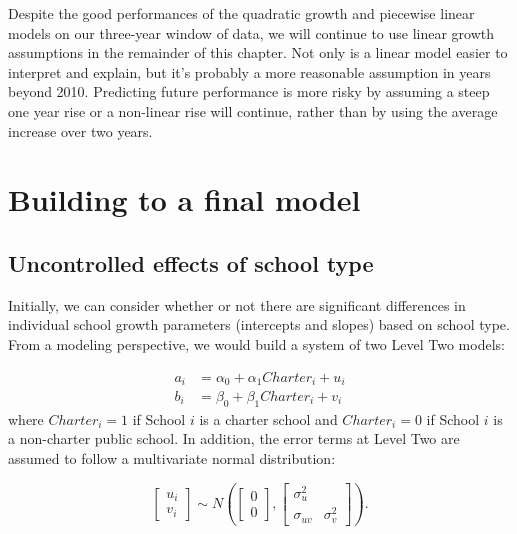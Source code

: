 \documentclass[
]{krantz}
\begin{document}
Despite the good performances of the quadratic growth and piecewise linear models on our three-year window of data, we will continue to use linear growth assumptions in the remainder of this chapter. Not only is a linear model easier to interpret and explain, but it's probably a more reasonable assumption in years beyond 2010. Predicting future performance is more risky by assuming a steep one year rise or a non-linear rise will continue, rather than by using the average increase over two years.

\hypertarget{finalmodel}{%
\section{Building to a final model}\label{finalmodel}}

\hypertarget{sec:modelc9}{%
\subsection{Uncontrolled effects of school type}\label{sec:modelc9}}

Initially, we can consider whether or not there are significant differences in individual school growth parameters (intercepts and slopes) based on school type. From a modeling perspective, we would build a system of two Level Two models:

\begin{align*}
a_{i} & = \alpha_{0} + \alpha_{1}Charter_i + u_{i} \\
b_{i} & = \beta_{0} + \beta_{1}Charter_i + v_{i}
\end{align*}
where \(Charter_i=1\) if School \(i\) is a charter school and \(Charter_i=0\) if School \(i\) is a non-charter public school. In addition, the error terms at Level Two are assumed to follow a multivariate normal distribution:

\[ \left[ \begin{array}{c}
            u_{i} \\ v_{i}
          \end{array}  \right] \sim N \left( \left[
          \begin{array}{c}
            0 \\ 0
          \end{array} \right], \left[
          \begin{array}{cc}
            \sigma_{u}^{2} & \\
            \sigma_{uv} & \sigma_{v}^{2}
          \end{array} \right] \right) . \]
\end{document}
